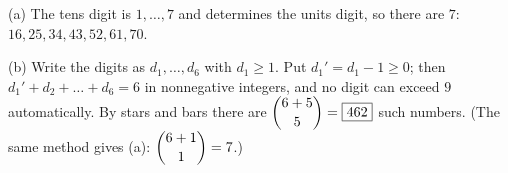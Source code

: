 (a) The tens digit is $1,\dots,7$ and determines the units digit, so there are $\boxed{7}$: $16,25,34,43,52,61,70$.

(b) Write the digits as $d_1,\dots,d_6$ with $d_1\ge1$. Put $d_1'=d_1-1\ge0$; then $d_1'+d_2+\dots+d_6=6$ in nonnegative integers, and no digit can exceed $9$ automatically. By stars and bars there are $\dbinom{6+5}{5}=\boxed{462}$ such numbers. (The same method gives (a): $\dbinom{6+1}{1}=7$.)
